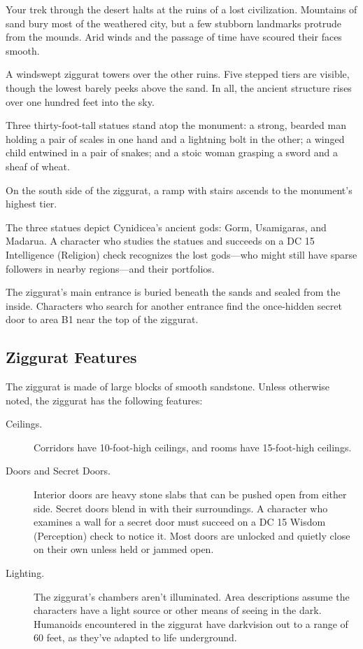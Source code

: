 \documentclass[10pt,a4paper,twoside,bg=print,twocolumn,openany,nodeprecatedcode]{dndbook}
\begin{document}
\begin{DndReadAloud}{}
Your trek through the desert halts at the ruins of a lost civilization. Mountains of sand bury most of the weathered city, but a few stubborn landmarks protrude from the mounds. Arid winds and the passage of time have scoured their faces smooth.

A windswept ziggurat towers over the other ruins. Five stepped tiers are visible, though the lowest barely peeks above the sand. In all, the ancient structure rises over one hundred feet into the sky.

Three thirty-foot-tall statues stand atop the monument: a strong, bearded man holding a pair of scales in one hand and a lightning bolt in the other; a winged child entwined in a pair of snakes; and a stoic woman grasping a sword and a sheaf of wheat.

On the south side of the ziggurat, a ramp with stairs ascends to the monument's highest tier.

\end{DndReadAloud}

The three statues depict Cynidicea's ancient gods: Gorm, Usamigaras, and Madarua. A character who studies the statues and succeeds on a DC 15 Intelligence (Religion) check recognizes the lost gods—who might still have sparse followers in nearby regions—and their portfolios.

The ziggurat's main entrance is buried beneath the sands and sealed from the inside. Characters who search for another entrance find the once-hidden secret door to area B1 near the top of the ziggurat.

\subsection{Ziggurat Features}
The ziggurat is made of large blocks of smooth sandstone. Unless otherwise noted, the ziggurat has the following features:


\begin{description}
\item[Ceilings.]
Corridors have 10-foot-high ceilings, and rooms have 15-foot-high ceilings.
\item[Doors and Secret Doors.]
Interior doors are heavy stone slabs that can be pushed open from either side. Secret doors blend in with their surroundings. A character who examines a wall for a secret door must succeed on a DC 15 Wisdom (Perception) check to notice it. Most doors are unlocked and quietly close on their own unless held or jammed open.
\item[Lighting.]
The ziggurat's chambers aren't illuminated. Area descriptions assume the characters have a light source or other means of seeing in the dark. Humanoids encountered in the ziggurat have darkvision out to a range of 60 feet, as they've adapted to life underground.
\end{description}
\end{document}
